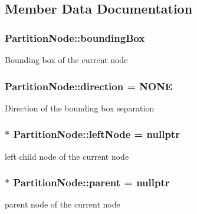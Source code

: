 \subsection{Member Data Documentation}
\hypertarget{struct_partition_node_a7f1efc38b6bbdf4cc2f8e36574bbf276}{}
\subsubsection[{bounding\+Box}]{ Partition\+Node\+::bounding\+Box}\label{struct_partition_node_a7f1efc38b6bbdf4cc2f8e36574bbf276}
Bounding box of the current node \hypertarget{struct_partition_node_a5e861a43672acf654394a15b012df231}{}
\subsubsection[{direction}]{ Partition\+Node\+::direction = {\bf N\+O\+N\+E}}\label{struct_partition_node_a5e861a43672acf654394a15b012df231}
Direction of the bounding box separation \hypertarget{struct_partition_node_a82bfd35cfcfc913ab41b2cb8c3c2f499}{}
\subsubsection[{left\+Node}]{$\ast$ Partition\+Node\+::left\+Node = nullptr}\label{struct_partition_node_a82bfd35cfcfc913ab41b2cb8c3c2f499}
left child node of the current node \hypertarget{struct_partition_node_a4d66482e5a4c91717fd0d935557ceb14}{}
\subsubsection[{parent}]{$\ast$ Partition\+Node\+::parent = nullptr}\label{struct_partition_node_a4d66482e5a4c91717fd0d935557ceb14}
parent node of the current node \hypertarget{struct_partition_node_a673d8267a9eb0a5c77bdfc48b00f1e16}{}
